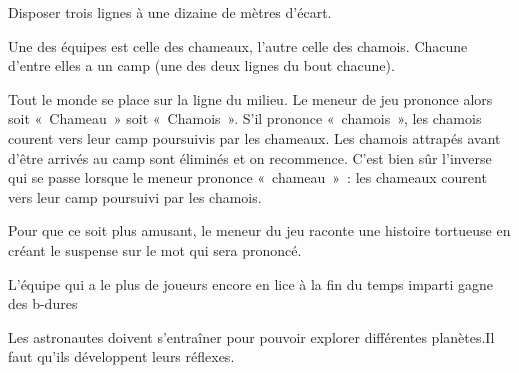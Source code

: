 \documentclass{grand-jeu}
\begin{document}
\begin{liste-materiel}
\end{liste-materiel}

\begin{regles}
Disposer trois lignes à une dizaine de mètres d'écart. 

Une des équipes est celle des chameaux, l’autre celle des chamois. Chacune d’entre elles a un camp (une des deux lignes du bout chacune).

Tout le monde se place sur la ligne du milieu. Le meneur de jeu prononce alors soit « Chameau » soit « Chamois ». S’il prononce « chamois », les chamois courent vers leur camp poursuivis par les chameaux. Les chamois attrapés avant d’être arrivés au camp sont éliminés et on recommence. C’est bien sûr l’inverse qui se passe lorsque le meneur prononce « chameau » : les chameaux courent vers leur camp poursuivi par les chamois.

Pour que ce soit plus amusant, le meneur du jeu raconte une histoire tortueuse en créant le suspense sur le mot qui sera prononcé. 

L'équipe qui a le plus de joueurs encore en lice à la fin du temps imparti gagne des b-dures
\end{regles}

\begin{imaginaire}
Les astronautes doivent s'entraîner pour pouvoir explorer différentes planètes.Il faut qu'ils développent leurs réflexes. 
\end{imaginaire}

\begin{moments-stop}
\end{moments-stop}
\end{document}
